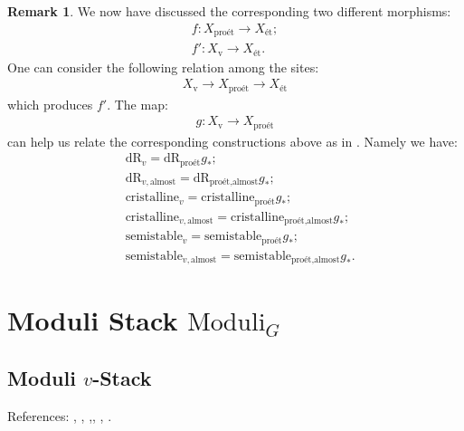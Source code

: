 \documentclass[12pt]{book}
\theoremstyle{definition}
\newtheorem{remark}{Remark}
\begin{document}
\begin{remark}
We now have discussed the corresponding two different morphisms:
\begin{align}
f: X_\text{pro\'et}\longrightarrow X_\text{\'et};\\
f': X_\text{v}\longrightarrow X_\text{\'et}.
\end{align}
One can consider the following relation among the sites:
\begin{align}
X_\text{v}\longrightarrow X_\text{pro\'et}\longrightarrow X_\text{\'et}
\end{align}
which produces $f'$. The map:
\begin{align}
g: X_\text{v}\longrightarrow X_\text{pro\'et}
\end{align}
can help us relate the corresponding constructions above as in \cite[Proposition 2.37]{B}. Namely we have:
\begin{align}
&\mathrm{dR}_{v}=\mathrm{dR}_{\text{pro\'et}}g_*;\\
&\mathrm{dR}_{v,\text{almost}}=\mathrm{dR}_{\text{pro\'et},\text{almost}}g_*;\\
&\mathrm{cristalline}_{v}=\mathrm{cristalline}_{\text{pro\'et}}g_*;\\
&\mathrm{cristalline}_{v,\text{almost}}=\mathrm{cristalline}_{\text{pro\'et},\text{almost}}g_*;\\
&\mathrm{semistable}_{v}=\mathrm{semistable}_{\text{pro\'et}}g_*;\\
&\mathrm{semistable}_{v,\text{almost}}=\mathrm{semistable}_{\text{pro\'et},\text{almost}}g_*.
\end{align} 
\end{remark}










\chapter{Moduli Stack $\mathrm{Moduli}_G$}

\newpage
\section{Moduli $v$-Stack}

\noindent References: \cite{FS}, \cite{FF}, \cite{Sch1},\cite{Sch2}, \cite{KL1}, \cite{KL2}.\\
\end{document}
